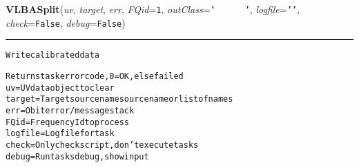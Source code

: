     \label{VLBACal:VLBASplit}
    \vspace{0.5ex}

    \begin{boxedminipage}{\textwidth}

    \raggedright \textbf{VLBASplit}(\textit{uv}, \textit{target}, \textit{err}, \textit{FQid}=\texttt{1\-}, \textit{outClass}=\texttt{'\-~\-~\-~\-~\-~\-~\-'\-}, \textit{logfile}=\texttt{'\-'\-}, \textit{check}=\texttt{F\-a\-l\-s\-e\-}, \textit{debug}=\texttt{F\-a\-l\-s\-e\-})

    \vspace{-1.5ex}

    \rule{\textwidth}{0.5\fboxrule}
\begin{alltt}
Write calibrated data

Returns task error code, 0=OK, else failed
uv       = UV data object to clear
target   = Target source name source name or list of names
err      = Obit error/message stack
FQid     = Frequency Id to process
logfile  = Log file for task
check    = Only check script, don't execute tasks
debug    = Run tasks debug, show input\end{alltt}

    \vspace{1ex}

    \end{boxedminipage}

    \label{VLBACal:VLBAUVFITS}
    \vspace{0.5ex}

